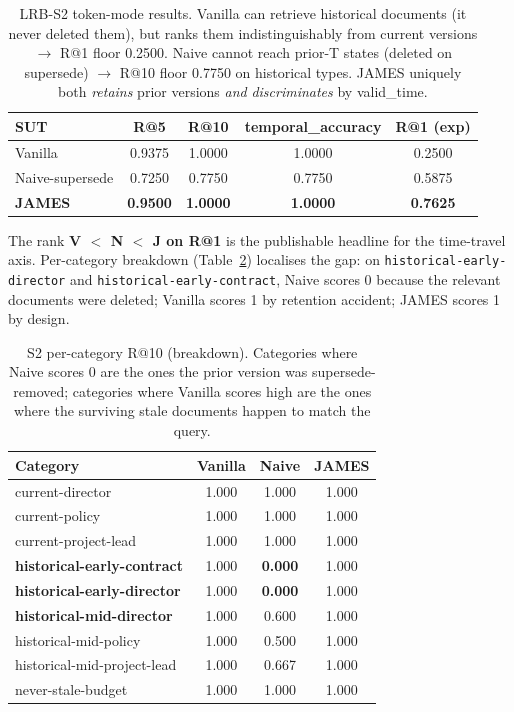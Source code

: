 \documentclass[11pt,a4paper]{article}
\begin{document}
\begin{table}[h]
\centering
\caption{LRB-S2 token-mode results. Vanilla can retrieve historical documents (it never deleted them), but ranks them indistinguishably from current versions $\rightarrow$ R@1 floor 0.2500. Naive cannot reach prior-T states (deleted on supersede) $\rightarrow$ R@10 floor 0.7750 on historical types. JAMES uniquely both \emph{retains} prior versions \emph{and} \emph{discriminates} by valid\_time.}
\label{tab:phase_b}
\begin{tabular}{l c c c c}
\toprule
\textbf{SUT} & \textbf{R@5} & \textbf{R@10} & \textbf{temporal\_accuracy} & \textbf{R@1 (exp)} \\
\midrule
Vanilla & 0.9375 & 1.0000 & 1.0000 & 0.2500 \\
Naive-supersede & 0.7250 & 0.7750 & 0.7750 & 0.5875 \\
\textbf{JAMES} & \textbf{0.9500} & \textbf{1.0000} & \textbf{1.0000} & \textbf{0.7625} \\
\bottomrule
\end{tabular}
\end{table}

The rank \textbf{V $<$ N $<$ J on R@1} is the publishable headline for the time-travel axis. Per-category breakdown (Table~\ref{tab:phase_b_cat}) localises the gap: on \texttt{historical-early-director} and \texttt{historical-early-contract}, Naive scores 0 because the relevant documents were deleted; Vanilla scores 1 by retention accident; JAMES scores 1 by design.

\begin{table}[h]
\centering
\caption{S2 per-category R@10 (breakdown). Categories where Naive scores 0 are the ones the prior version was supersede-removed; categories where Vanilla scores high are the ones where the surviving stale documents happen to match the query.}
\label{tab:phase_b_cat}
\begin{tabular}{l c c c}
\toprule
\textbf{Category} & \textbf{Vanilla} & \textbf{Naive} & \textbf{JAMES} \\
\midrule
current-director & 1.000 & 1.000 & 1.000 \\
current-policy & 1.000 & 1.000 & 1.000 \\
current-project-lead & 1.000 & 1.000 & 1.000 \\
\textbf{historical-early-contract} & 1.000 & \textbf{0.000} & 1.000 \\
\textbf{historical-early-director} & 1.000 & \textbf{0.000} & 1.000 \\
\textbf{historical-mid-director} & 1.000 & 0.600 & 1.000 \\
historical-mid-policy & 1.000 & 0.500 & 1.000 \\
historical-mid-project-lead & 1.000 & 0.667 & 1.000 \\
never-stale-budget & 1.000 & 1.000 & 1.000 \\
\bottomrule
\end{tabular}
\end{table}
\end{document}
